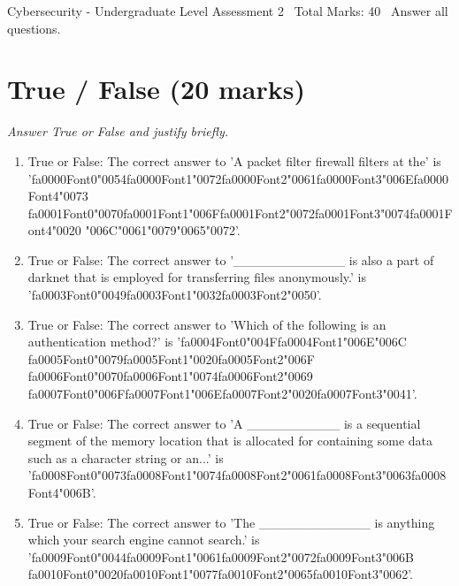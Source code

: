 \documentclass[12pt]{article}
\begin{document}
\begin{center}
Cybersecurity - Undergraduate Level Assessment 2 \
Total Marks: 40 \
Answer all questions.
\end{center}

\section*{True / False (20 marks)}
\textit{Answer True or False and justify briefly.}
\begin{enumerate}[label=\arabic*.]
\item True or False: The correct answer to 'A packet filter firewall filters at the' is '{\csname fa0000Font0\endcsname\char"0054}{\csname fa0000Font1\endcsname\char"0072}{\csname fa0000Font2\endcsname\char"0061}{\csname fa0000Font3\endcsname\char"006E}{\csname fa0000Font4\endcsname\char"0073} {\csname fa0001Font0\endcsname\char"0070}{\csname fa0001Font1\endcsname\char"006F}{\csname fa0001Font2\endcsname\char"0072}{\csname fa0001Font3\endcsname\char"0074}{\csname fa0001Font4\endcsname\char"0020} {\char"006C}{\char"0061}{\char"0079}{\char"0065}{\char"0072}'.
\item True or False: The correct answer to '\_\_\_\_\_\_\_\_\_\_\_\_ is also a part of darknet that is employed for transferring files anonymously.' is '{\csname fa0003Font0\endcsname\char"0049}{\csname fa0003Font1\endcsname\char"0032}{\csname fa0003Font2\endcsname\char"0050}'.
\item True or False: The correct answer to 'Which of the following is an authentication method?' is '{\csname fa0004Font0\endcsname\char"004F}{\csname fa0004Font1\endcsname\char"006E}{\char"006C} {\csname fa0005Font0\endcsname\char"0079}{\csname fa0005Font1\endcsname\char"0020}{\csname fa0005Font2\endcsname\char"006F} {\csname fa0006Font0\endcsname\char"0070}{\csname fa0006Font1\endcsname\char"0074}{\csname fa0006Font2\endcsname\char"0069} {\csname fa0007Font0\endcsname\char"006F}{\csname fa0007Font1\endcsname\char"006E}{\csname fa0007Font2\endcsname\char"0020}{\csname fa0007Font3\endcsname\char"0041}'.
\item True or False: The correct answer to 'A \_\_\_\_\_\_\_\_\_\_ is a sequential segment of the memory location that is allocated for containing some data such as a character string or an...' is '{\csname fa0008Font0\endcsname\char"0073}{\csname fa0008Font1\endcsname\char"0074}{\csname fa0008Font2\endcsname\char"0061}{\csname fa0008Font3\endcsname\char"0063}{\csname fa0008Font4\endcsname\char"006B}'.
\item True or False: The correct answer to 'The \_\_\_\_\_\_\_\_\_\_\_\_ is anything which your search engine cannot search.' is '{\csname fa0009Font0\endcsname\char"0044}{\csname fa0009Font1\endcsname\char"0061}{\csname fa0009Font2\endcsname\char"0072}{\csname fa0009Font3\endcsname\char"006B} {\csname fa0010Font0\endcsname\char"0020}{\csname fa0010Font1\endcsname\char"0077}{\csname fa0010Font2\endcsname\char"0065}{\csname fa0010Font3\endcsname\char"0062}'.

\end{enumerate}
\end{document}
